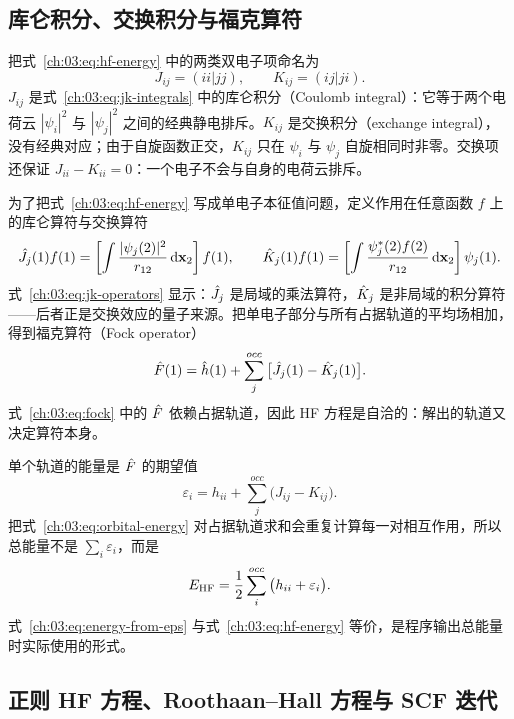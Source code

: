 \subsection{库仑积分、交换积分与福克算符}
\label{ch:03:sec:fock}

把式~\eqref{ch:03:eq:hf-energy} 中的两类双电子项命名为
\begin{equation}
J_{ij} = (ii|jj),
\qquad
K_{ij} = (ij|ji).
\label{ch:03:eq:jk-integrals}
\end{equation}
$J_{ij}$ 是式~\eqref{ch:03:eq:jk-integrals} 中的库仑积分（Coulomb integral）：它等于两个电荷云 $|\psi_i|^2$ 与 $|\psi_j|^2$ 之间的经典静电排斥。$K_{ij}$ 是交换积分（exchange integral），没有经典对应；由于自旋函数正交，$K_{ij}$ 只在 $\psi_i$ 与 $\psi_j$ 自旋相同时非零。交换项还保证 $J_{ii}-K_{ii}=0$：一个电子不会与自身的电荷云排斥。

为了把式~\eqref{ch:03:eq:hf-energy} 写成单电子本征值问题，定义作用在任意函数 $f$ 上的库仑算符与交换算符
\begin{equation}
\hat{J}_j(1)f(1)
= \left[\int \frac{|\psi_j(2)|^2}{r_{12}}\,\mathrm{d}\mathbf{x}_2\right] f(1),
\qquad
\hat{K}_j(1)f(1)
= \left[\int \frac{\psi_j^*(2)f(2)}{r_{12}}\,\mathrm{d}\mathbf{x}_2\right]\psi_j(1).
\label{ch:03:eq:jk-operators}
\end{equation}
式~\eqref{ch:03:eq:jk-operators} 显示：$\hat{J}_j$ 是局域的乘法算符，$\hat{K}_j$ 是非局域的积分算符——后者正是交换效应的量子来源。把单电子部分与所有占据轨道的平均场相加，得到福克算符（Fock operator）
\begin{equation}
\hat{F}(1)
= \hat{h}(1) + \sum_j^{occ}\big[\hat{J}_j(1)-\hat{K}_j(1)\big].
\label{ch:03:eq:fock}
\end{equation}
式~\eqref{ch:03:eq:fock} 中的 $\hat{F}$ 依赖占据轨道，因此 HF 方程是自洽的：解出的轨道又决定算符本身。

单个轨道的能量是 $\hat{F}$ 的期望值
\begin{equation}
\varepsilon_i
= h_{ii} + \sum_j^{occ}\big(J_{ij}-K_{ij}\big).
\label{ch:03:eq:orbital-energy}
\end{equation}
把式~\eqref{ch:03:eq:orbital-energy} 对占据轨道求和会重复计算每一对相互作用，所以总能量不是 $\sum_i\varepsilon_i$，而是
\begin{equation}
E_{\mathrm{HF}} = \frac{1}{2}\sum_i^{occ}\big(h_{ii}+\varepsilon_i\big).
\label{ch:03:eq:energy-from-eps}
\end{equation}
式~\eqref{ch:03:eq:energy-from-eps} 与式~\eqref{ch:03:eq:hf-energy} 等价，是程序输出总能量时实际使用的形式。

\subsection{正则 HF 方程、Roothaan--Hall 方程与 SCF 迭代}
\label{ch:03:sec:roothaan}

